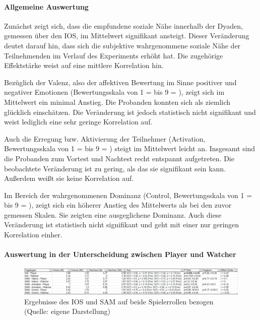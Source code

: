 \paragraph{Allgemeine Auswertung}

Zunächst zeigt sich, dass die empfundene soziale Nähe innerhalb der Dyaden, gemessen über den \ac{IOS}, im Mittelwert signifikant ansteigt. Dieser Veränderung deutet darauf hin, dass sich die subjektive wahrgenommene soziale Nähe der Teilnehmenden im Verlauf des Experiments erhöht hat. Die zugehörige Effektstärke weist auf eine mittlere Korrelation hin.

Bezüglich der Valenz, also der affektiven Bewertung im Sinne positiver und negativer Emotionen (Bewertungsskala von 1 =  bis 9 = ), zeigt sich im Mittelwert ein minimal Anstieg. Die Probanden konnten sich als ziemlich glücklich einschätzen. Die Veränderung ist jedoch statistisch nicht signifikant und weist lediglich eine sehr geringe Korrelation auf.

Auch die Erregung bzw. Aktivierung der Teilnehmer (Activation, Bewertungsskala von 1 =  bis 9 = ) steigt im Mittelwert leicht an. Insgesamt sind die Probanden zum Vortest und Nachtest recht entspannt aufgetreten. Die beobachtete Veränderung ist zu gering, als das sie signifikant sein kann. Außerdem weißt sie keine Korrelation auf.

Im Bereich der wahrgenommenen Dominanz (Control, Bewertungsskala von 1 =  bis 9 = ), zeigt sich ein höherer Anstieg des Mittelwerts als bei den zuvor gemessen Skalen. Sie zeigten eine ausgeglichene Dominanz. Auch diese Veränderung ist statistisch nicht signifikant und geht mit einer nur geringen Korrelation einher.

\paragraph{Auswertung in der Unterscheidung zwischen Player und Watcher}

\begin{figure}[ht]
\centering
\includegraphics[width=1\linewidth]{content/pictures/IOS_SAM_Player_Watcher.png}
\caption{Ergebnisse des \ac{IOS} und \ac{SAM} auf beide Spielerrollen bezogen (Quelle: eigene Darstellung)}
\label{fig:ios_sam_roles}
\end{figure}

